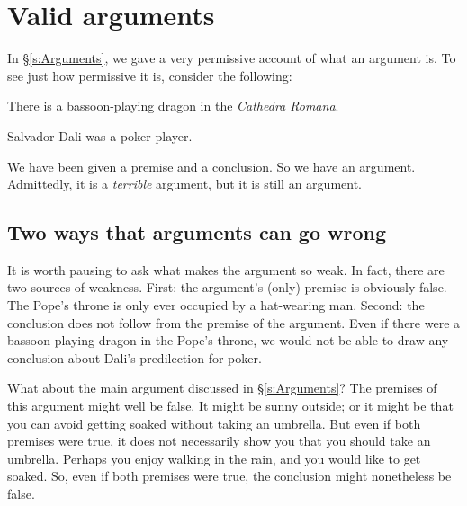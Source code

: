 \chapter{Valid arguments}
\label{s:Valid}

In \S\ref{s:Arguments}, we gave a very permissive account of what an argument is. To see just how permissive it is, consider the following:
	\begin{earg}
		\item[] There is a bassoon-playing dragon in the \emph{Cathedra Romana}.
		\item[\therefore] Salvador Dali was a poker player.
	\end{earg}
We have been given a premise and a conclusion. So we have an argument. Admittedly, it is a \emph{terrible} argument, but it is still an argument.

\section{Two ways that arguments can go wrong}

It is worth pausing to ask what makes the argument so weak. In fact, there are two sources of weakness. First: the argument's (only) premise is obviously false. The Pope's throne is only ever occupied by a hat-wearing man. Second: the conclusion does not follow from the premise of the argument. Even if there were a bassoon-playing dragon in the Pope's throne, we would not be able to draw any conclusion about Dali's predilection for poker.

What about the main argument discussed in \S\ref{s:Arguments}? The premises of this argument might well be false. It might be sunny outside; or it might be that you can avoid getting soaked without taking an umbrella. But even if both premises were true, it does not necessarily show you that you should take an umbrella. Perhaps you enjoy walking in the rain, and you would like to get soaked. So, even if both premises were true, the conclusion might nonetheless be false.

%

